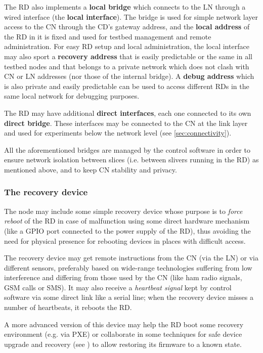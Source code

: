 \documentclass[conference]{IEEEtran}
\begin{document}
The RD also implements a \textbf{local bridge} which connects to the LN
through a wired interface (the \textbf{local interface}).  The bridge is used
for simple network layer access to the CN through the CD's gateway address,
and the \textbf{local address} of the RD in it is fixed and used for testbed
management and remote administration.  For easy RD setup and local
administration, the local interface may also sport a \textbf{recovery address}
that is easily predictable or the same in all testbed nodes and that belongs
to a private network which does not clash with CN or LN addresses (nor those
of the internal bridge).  A \textbf{debug address} which is also private and
easily predictable can be used to access different RDs in the same local
network for debugging purposes.

The RD may have additional \textbf{direct interfaces}, each one connected to
its own \textbf{direct bridge}.  These interfaces may be connected to the CN
at the link layer and used for experiments below the network level (see
\ref{sec:connectivity}).

All the aforementioned bridges are managed by the control software in order to
ensure network isolation between slices (i.e. between slivers running in the
RD) as mentioned above, and to keep CN stability and privacy.

\subsubsection{The recovery device}

The node may include some simple recovery device whose purpose is to
\emph{force reboot} of the RD in case of malfunction using some direct
hardware mechanism (like a GPIO port connected to the power supply of the RD),
thus avoiding the need for physical presence for rebooting devices in places
with difficult access.

The recovery device may get remote instructions from the CN (via the LN) or
via different sensors, preferably based on wide-range technologies suffering
from low interference and differing from those used by the CN (like ham radio
signals, GSM calls or SMS).  It may also receive a \emph{heartbeat signal}
kept by control software via some direct link like a serial line; when the
recovery device misses a number of heartbeats, it reboots the RD.

A more advanced version of this device may help the RD boot some recovery
environment (e.g. via PXE) or collaborate in some techniques for safe device
upgrade and recovery (see \cite{van12}) to allow restoring its firmware to a
known state.
\end{document}
